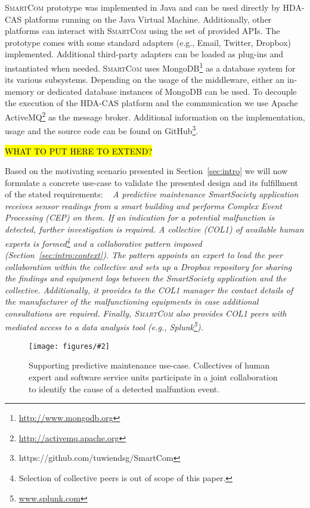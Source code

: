 \documentclass{llncs}
\newcommand{\mdl}{\textsc{SmartCom}}
\newcommand{\figfloat}[3][0.9]{
\begin{figure}[h] 
\centering
\texttt{[image: figures/\#2]}
\caption{#3}
\label{fig:#2}
\end{figure}
}
\begin{document}
  
  \mdl{} prototype
  was implemented in Java and can be used directly by HDA-CAS platforms running on the Java Virtual Machine. Additionally, other platforms can interact with \mdl{} using the set of provided APIs\footnotemark. 
  The prototype comes with some standard adapters (e.g., Email, Twitter, Dropbox) implemented. 
  Additional third-party adapters can be loaded as plug-ins and instantiated when needed.
  \mdl{} uses MongoDB\footnote{\url{http://www.mongodb.org}} as a database system for its various subsystems. Depending on the usage of the middleware, either an in-memory or dedicated database instances of MongoDB can be used. To decouple the execution of the HDA-CAS platform and the communication we use Apache ActiveMQ\footnote{\url{http://activemq.apache.org}} as the message broker.
  Additional information on the implementation, usage and the source code can be found on GitHub\footnote{https://github.com/tuwiendsg/SmartCom}. 

  	\hl{WHAT TO PUT HERE TO EXTEND?}


    Based on the motivating scenario presented in Section~\ref{sec:intro} we will now formulate a concrete use-case to validate the presented design and its fulfillment of the stated requirements:
    ~
    \emph{A predictive maintenance SmartSociety application receives sensor readings from a smart building and performs Complex Event Processing (CEP) on them. If an indication for a potential malfunction is detected, further investigation is required. A collective (COL1) of available human experts is formed\footnote{Selection of collective peers is out of scope of this paper.} and a collaborative pattern imposed (Section~\ref{sec:intro:context}). The pattern appoints an expert to lead the peer collaboration within the collective and sets up a Dropbox repository for sharing the findings and equipment logs between the SmartSociety application and the collective. Additionally, it provides to the COL1 manager the contact details of the manufacturer of the malfunctioning equipments in case additional consultations are required. Finally, \mdl{} also provides COL1 peers with mediated access to a data analysis tool (e.g., Splunk\footnote{\url{www.splunk.com}}).
    }

    \figfloat[.8]{use-case}{
    Supporting predictive maintenance use-case. Collectives of human expert and software service units participate in a joint collaboration to identify the cause of a detected malfuntion event.}
    
\end{document}
